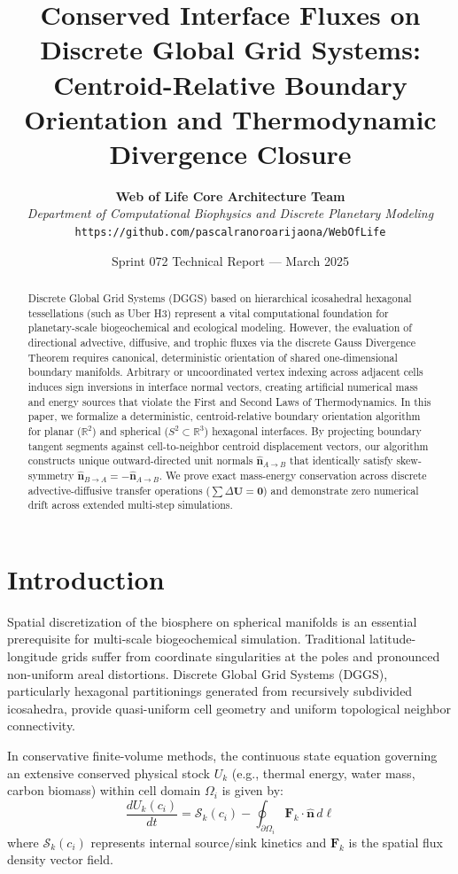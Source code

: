 \documentclass[10pt,twocolumn,a4paper]{article}
\title{\textbf{Conserved Interface Fluxes on Discrete Global Grid Systems: Centroid-Relative Boundary Orientation and Thermodynamic Divergence Closure}}
\author{
  \textbf{Web of Life Core Architecture Team} \\
  \textit{Department of Computational Biophysics and Discrete Planetary Modeling} \\
  \texttt{https://github.com/pascalranoroarijaona/WebOfLife}
}
\date{Sprint 072 Technical Report --- March 2025}
\begin{document}
\maketitle

\begin{abstract}
Discrete Global Grid Systems (DGGS) based on hierarchical icosahedral hexagonal tessellations (such as Uber H3) represent a vital computational foundation for planetary-scale biogeochemical and ecological modeling. However, the evaluation of directional advective, diffusive, and trophic fluxes via the discrete Gauss Divergence Theorem requires canonical, deterministic orientation of shared one-dimensional boundary manifolds. Arbitrary or uncoordinated vertex indexing across adjacent cells induces sign inversions in interface normal vectors, creating artificial numerical mass and energy sources that violate the First and Second Laws of Thermodynamics. In this paper, we formalize a deterministic, centroid-relative boundary orientation algorithm for planar ($\mathbb{R}^2$) and spherical ($S^2 \subset \mathbb{R}^3$) hexagonal interfaces. By projecting boundary tangent segments against cell-to-neighbor centroid displacement vectors, our algorithm constructs unique outward-directed unit normals $\hat{\mathbf{n}}_{A \to B}$ that identically satisfy skew-symmetry $\hat{\mathbf{n}}_{B \to A} = -\hat{\mathbf{n}}_{A \to B}$. We prove exact mass-energy conservation across discrete advective-diffusive transfer operations ($\sum \Delta \mathbf{U} = \mathbf{0}$) and demonstrate zero numerical drift across extended multi-step simulations.
\end{abstract}

\section{Introduction}
Spatial discretization of the biosphere on spherical manifolds is an essential prerequisite for multi-scale biogeochemical simulation. Traditional latitude-longitude grids suffer from coordinate singularities at the poles and pronounced non-uniform areal distortions. Discrete Global Grid Systems (DGGS), particularly hexagonal partitionings generated from recursively subdivided icosahedra, provide quasi-uniform cell geometry and uniform topological neighbor connectivity.

In conservative finite-volume methods, the continuous state equation governing an extensive conserved physical stock $U_k$ (e.g., thermal energy, water mass, carbon biomass) within cell domain $\Omega_i$ is given by:
\begin{equation}
\frac{d U_k(c_i)}{dt} = \mathcal{S}_k(c_i) - \oint_{\partial \Omega_i} \mathbf{F}_k \cdot \hat{\mathbf{n}} \, d\ell
\end{equation}
where $\mathcal{S}_k(c_i)$ represents internal source/sink kinetics and $\mathbf{F}_k$ is the spatial flux density vector field.
\end{document}
